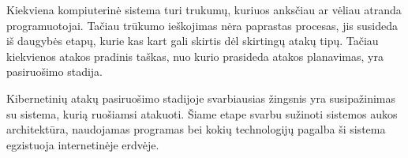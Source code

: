 Kiekviena kompiuterinė sistema turi trukumų, kuriuos anksčiau ar vėliau atranda programuotojai. Tačiau trūkumo ieškojimas nėra paprastas procesas, jis susideda iš daugybės etapų, kurie kas kart gali skirtis dėl skirtingų atakų tipų. Tačiau kiekvienos atakos pradinis taškas, nuo kurio prasideda atakos planavimas, yra pasiruošimo stadija.

Kibernetinių atakų pasiruošimo stadijoje svarbiausias žingsnis yra susipažinimas su sistema, kurią ruošiamsi atakuoti. Šiame etape svarbu sužinoti sistemos aukos architektūra, naudojamas programas bei kokių technologijų pagalba ši sistema egzistuoja internetinėje erdvėje.